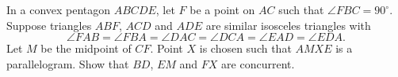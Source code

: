 In a convex pentagon $ABCDE$, let $F$ be a point on $AC$ such that $\angle FBC = 90^{\circ}$. Suppose triangles $ABF$, $ACD$ and $ADE$ are similar isosceles triangles with
\[
\angle FAB = \angle FBA = \angle DAC = \angle DCA = \angle EAD = \angle EDA.
\]
Let $M$ be the midpoint of $CF$. Point $X$ is chosen such that $AMXE$ is a parallelogram. Show that $BD$, $EM$ and $FX$ are concurrent.
